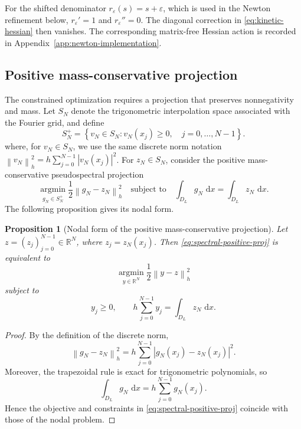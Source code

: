 \documentclass[11pt]{article}
\newcommand{\R}{\mathbb{R}}
\newcommand{\SN}{S_N}
\newcommand{\SNP}{S_N^+}
\newcommand{\dd}{\,\mathrm{d}}
\newcommand{\eps}{\varepsilon}
\newcommand{\norm}[1]{\left\|#1\right\|}
\theoremstyle{plain}
\newtheorem{proposition}[theorem]{Proposition}
\theoremstyle{definition}
\numberwithin{equation}{section}
\begin{document}
For the shifted denominator $r_\eps(s)=s+\eps$, which is used in the
Newton refinement below, $r_\eps'=1$ and $r_\eps''=0$. The diagonal
correction in \eqref{eq:kinetic-hessian} then vanishes. The
corresponding matrix-free Hessian action is recorded in
Appendix~\ref{app:newton-implementation}.

\subsection{Positive mass-conservative projection}

The constrained optimization requires a projection that preserves
nonnegativity and mass. Let $\SN$ denote the trigonometric
interpolation space associated with the Fourier grid, and define
\begin{equation}
\label{eq:SNplus}
\SNP
=
\left\{
v_N\in\SN:
v_N(x_j)\ge0,\quad j=0,\ldots,N-1
\right\}.
\end{equation}
where, for $v_N\in\SN$, we use the same discrete norm notation
$\norm{v_N}_h^2
=
h\sum_{j=0}^{N-1}|v_N(x_j)|^2$.
For $z_N\in\SN$, consider the positive mass-conservative
pseudospectral projection \cite{lin2024sinum}
\begin{equation}
\label{eq:spectral-positive-proj}
\operatorname*{argmin}_{g_N\in\SNP}
\frac12\norm{g_N-z_N}_h^2
\quad
\text{subject to}
\quad
\int_{D_L}g_N\,\dd x
=
\int_{D_L}z_N\,\dd x .
\end{equation}
The following proposition gives its nodal form.

\begin{proposition}[Nodal form of the positive mass-conservative projection]
\label{prop:proj-equiv}
Let $z=(z_j)_{j=0}^{N-1}\in\R^N$, where $z_j=z_N(x_j)$.
Then \eqref{eq:spectral-positive-proj} is equivalent to
\[
\operatorname*{argmin}_{y\in\R^N}
\frac12\norm{y-z}_h^2
\]
subject to
\[
y_j\ge0,
\qquad
h\sum_{j=0}^{N-1}y_j
=
\int_{D_L}z_N\,\dd x .
\]
\end{proposition}

\begin{proof}
By the definition of the discrete norm,
\[
\norm{g_N-z_N}_h^2
=
h\sum_{j=0}^{N-1}
|g_N(x_j)-z_N(x_j)|^2.
\]
Moreover, the trapezoidal rule is exact for trigonometric
polynomials, so
\[
\int_{D_L}g_N\,\dd x
=
h\sum_{j=0}^{N-1}g_N(x_j).
\]
Hence the objective and constraints in
\eqref{eq:spectral-positive-proj} coincide with those of the nodal
problem.
\end{proof}
\end{document}
